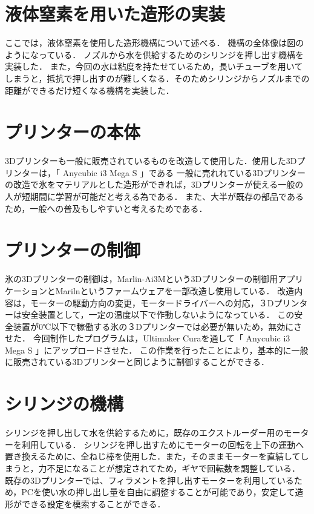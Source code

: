 \section{液体窒素を用いた造形の実装}
\label{sec:paragraph}
ここでは，液体窒素を使用した造形機構について述べる．
機構の全体像は図のようになっている．
ノズルから水を供給するためのシリンジを押し出す機構を実装した．
また，今回の水は粘度を持たせているため，長いチューブを用いてしまうと，抵抗で押し出すのが難しくなる．そのためシリンジからノズルまでの距離ができるだけ短くなる機構を実装した．

\section{プリンターの本体}
\label{sec:paragraph}
3Dプリンターも一般に販売されているものを改造して使用した．使用した3Dプリンターは，「 Anycubic i3 Mega S 」である
一般に売れれている3Dプリンターの改造で氷をマテリアルとした造形ができれば，3Dプリンターが使える一般の人が短期間に学習が可能だと考える為である．
また、大半が既存の部品であるため，一般への普及もしやすいと考えるためである．

\section{プリンターの制御}
\label{sec:paragraph}
氷の3Dプリンターの制御は，Marlin-Ai3Mという3Dプリンターの制御用アプリケーションとMarilnというファームウェアを一部改造し使用している．
改造内容は，モーターの駆動方向の変更，モータードライバーへの対応，３Dプリンターは安全装置として，一定の温度以下で作動しないようになっている．
この安全装置が0℃以下で稼働する氷の３Dプリンターでは必要が無いため，無効にさせた．
今回制作したプログラムは，Ultimaker Curaを通して「 Anycubic i3 Mega S 」にアップロードさせた．
この作業を行ったことにより，基本的に一般に販売されている3Dプリンターと同じように制御することができる．

\section{シリンジの機構}
\label{sec:paragraph}
シリンジを押し出して水を供給するために，既存のエクストルーダー用のモーターを利用している．
シリンジを押し出すためにモーターの回転を上下の運動へ置き換えるために、全ねじ棒を使用した．また，そのままモーターを直結してしまうと，力不足になることが想定されてため，ギヤで回転数を調整している．
既存の3Dプリンターでは、フィラメントを押し出すモーターを利用しているため，PCを使い水の押し出し量を自由に調整することが可能であり，安定して造形ができる設定を模索することができる．

